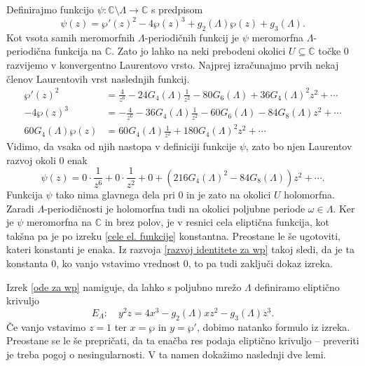 \documentclass[mat1]{fmfdelo}
\numberwithin{equation}{section}
\newcommand{\C}{\mathbb C}
\newcommand{\om}{\omega}
\theoremstyle{definition}
\begin{document}
\begin{dokaz}
    Definirajmo funkcijo $\psi:\C\setminus\Lambda \to \C$ s predpisom
    \[
        \psi(z) = \wp'(z)^2 - 4\wp(z)^3 + g_2(\Lambda)\wp(z) + g_3(\Lambda).
    \]
    Kot vsota samih meromorfnih $\Lambda$-periodičnih funkcij je $\psi$ meromorfna $\Lambda$-periodična funkcija na $\C$. Zato jo lahko na neki prebodeni okolici $U \subseteq \C$ točke $0$ razvijemo v konvergentno Laurentovo vrsto. Najprej izračunajmo prvih nekaj členov Laurentovih vrst naslednjih funkcij.
    \begin{align*}
        \wp'(z)^2 &= \frac{4}{z^6} - 24G_4(\Lambda)\frac{1}{z^2} - 80G_6(\Lambda) + 36G_4(\Lambda)^2z^2 + \cdots \\
        -4\wp(z)^3 &= -\frac{4}{z^6} - 36G_4(\Lambda) \frac{1}{z^2} - 60G_6(\Lambda) - 84G_8(\Lambda)z^2 + \cdots \\
        60G_4(\Lambda)\wp(z) &= 60G_4(\Lambda)\frac{1}{z^2} + 180G_4(\Lambda)^2z^2 + \cdots  
    \end{align*}
    Vidimo, da vsaka od njih nastopa v definiciji funkcije $\psi$, zato bo njen Laurentov razvoj okoli $0$ enak
    \begin{equation}
        \label{razvoj identitete za wp}    
        \psi(z) = 0 \cdot \frac{1}{z^6} + 0 \cdot \frac{1}{z^2} + 0 + (216G_4(\Lambda)^2 - 84G_8(\Lambda))z^2 + \cdots.
    \end{equation}
    Funkcija $\psi$ tako nima glavnega dela pri $0$ in je zato na okolici $U$ holomorfna. Zaradi $\Lambda$-periodičnosti je holomorfna tudi na okolici poljubne periode $\om\in\Lambda$. Ker je $\psi$ meromorfna na $\C$ in brez polov, je v resnici cela eliptična funkcija, kot takšna pa je po izreku \ref{cele el. funkcije} konstantna. Preostane le še ugotoviti, kateri konstanti je enaka. Iz razvoja \eqref{razvoj identitete za wp} takoj sledi, da je ta konstanta $0$, ko vanjo vstavimo vrednost $0$, to pa tudi zaključi dokaz izreka.
\end{dokaz}

Izrek \ref{ode za wp} namiguje, da lahko s poljubno mrežo $\Lambda$ definiramo eliptično krivuljo
\begin{equation}
    \label{elipticna krivulja glede na mrezo}    
    E_\Lambda : \quad y^2 z = 4x^3 - g_2(\Lambda)x z^2 - g_3(\Lambda) z^3.
\end{equation}
Če vanjo vstavimo $z = 1$ ter $x = \wp$ in $y = \wp'$, dobimo natanko formulo iz izreka. Preostane se le še prepričati, da ta enačba res podaja eliptično krivuljo -- preveriti je treba pogoj o nesingularnosti. V ta namen dokažimo naslednji dve lemi.
\end{document}

